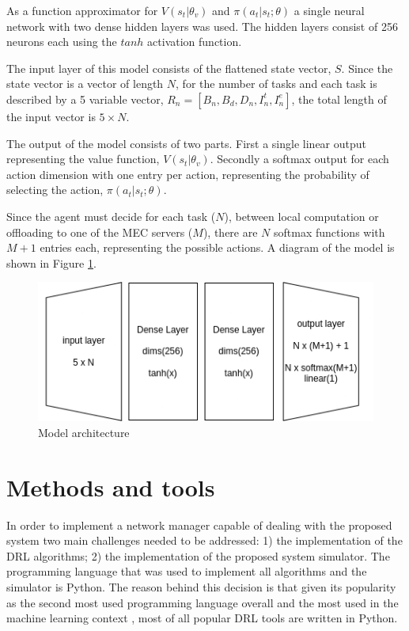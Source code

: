 As a function approximator for $V(s_t | \theta_v)$ and $\pi(a_t | s_t; \theta)$ a single neural network with two dense hidden layers was used. The hidden layers consist of 256 neurons each using the $tanh$ activation function. 

The input layer of this model consists of the flattened state vector, $S$. Since the state vector is a vector of length $N$, for the number of tasks and each task is described by a 5 variable vector, $R_n = [B_n, B_d, D_n, I_n^t, I_n^e]$, the total length of the input vector is $5 \times N$. 

The output of the model consists of two parts. First a single linear output representing the value function, $V(s_t | \theta_v)$. Secondly a softmax output for each action dimension with one entry per action, representing the probability of selecting the action, $\pi(a_t | s_t; \theta)$. 

Since the agent must decide for each task ($N$), between local computation or offloading to one of the MEC servers ($M$), there are $N$ softmax functions with $M+1$ entries each, representing the possible actions. A diagram of the model is shown in Figure \ref{fig:model}.

\begin{figure}[H]
  \centering
  \includegraphics[scale=0.8]{images/model_arch.png}
  \caption{Model architecture}
  \label{fig:model}
\end{figure}

\section{Methods and tools}

\noindent In order to implement a network manager capable of dealing with the proposed system two main challenges needed to be addressed: 1) the implementation of the \acrshort{DRL} algorithms; 2) the implementation of the proposed system simulator. The programming language that was used to implement all algorithms and the simulator is Python. The reason behind this decision is that given its popularity as the second most used programming language overall \cite{pythonpop} and the most used in the machine learning context \cite{pythonmachine}, most of all popular \acrshort{DRL} tools are written in Python.


